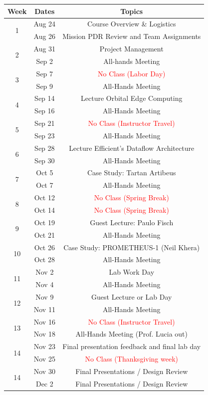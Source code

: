 \documentclass[11pt,letterpaper]{article}
\begin{document}
\begin{tabular}{c|c|c}
	Week & Dates & Topics \\
	\hline
	\multirow{2}{*}{1} & Aug 24 & Course Overview \& Logistics \\
	 & Aug 26 & Mission PDR Review and Team Assignments \\
	\hline
	\multirow{2}{*}{2} & Aug 31 & Project Management \\
	 & Sep 2 & All-hands Meeting\\
	\hline
	\multirow{2}{*}{3}  & Sep 7 & \textcolor{red}{No Class (Labor Day)} \\
	 & Sep 9 & All-Hands Meeting \\
	\hline
	\multirow{2}{*}{4} & Sep 14 & Lecture Orbital Edge Computing \\
	 & Sep 16 & All-Hands Meeting \\
	\hline
	\multirow{2}{*}{5}  & Sep 21 & \textcolor{red}{No Class (Instructor Travel)} \\
	 & Sep 23 & All-Hands Meeting  \\
	\hline
	\multirow{2}{*}{6}  & Sep 28 & Lecture Efficient's Dataflow Architecture  \\
	 & Sep 30 & All-Hands Meeting \\
	\hline
	\multirow{2}{*}{7}  & Oct 5 &  Case Study: Tartan Artibeus \\
	 & Oct 7 & All-Hands Meeting \\
	\hline
	\multirow{2}{*}{8}  & Oct 12 & \textcolor{red}{No Class (Spring Break)} \\
	 & Oct 14 & \textcolor{red}{No Class (Spring Break)} \\
	\hline
	\multirow{2}{*}{9}  & Oct 19 & Guest Lecture: Paulo Fisch \\
	 & Oct 21 & All-Hands Meeting \\
	\hline
	\multirow{2}{*}{10}  & Oct 26 & Case Study: PROMETHEUS-1 (Neil Khera) \\
	 & Oct 28 & All-Hands Meeting \\
	 \hline
	\multirow{2}{*}{11}  & Nov 2  & Lab Work Day \\
	 & Nov 4 & All-Hands Meeting \\
	 \hline
	\multirow{2}{*}{12}  & Nov 9 & Guest Lecture or Lab Day \\
	 & Nov 11 & All-Hands Meeting \\
	 \hline
	\multirow{2}{*}{13}  & Nov 16 &\textcolor{red}{No Class (Instructor Travel)} \\
	 & Nov 18 & All-Hands Meeting (Prof. Lucia out) \\
	 \hline
	\multirow{2}{*}{14}  & Nov 23 & Final presentation feedback and final lab day \\
	 & Nov 25 & \textcolor{red}{No Class (Thanksgiving week)} \\
	 \hline
	\multirow{2}{*}{14}  & Nov 30  & Final Presentations / Design Review \\
	 & Dec 2 & Final Presentations / Design Review \\
\end{tabular}
\end{document}
